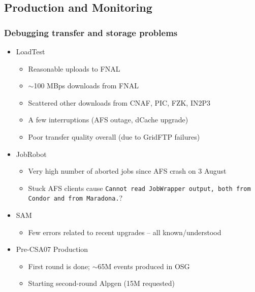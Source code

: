 \documentclass{beamer}
\newcommand{\ca}{\ensuremath{\sim}}
\begin{document}
\subsection{Production and Monitoring}
\begin{frame}
\frametitle{Debugging transfer and storage problems}
\begin{itemize}
    \item LoadTest
    \begin{itemize}
        \item Reasonable uploads to FNAL
        \item \ca{}100 MBps downloads from FNAL
        \item Scattered other downloads from CNAF, PIC, FZK, IN2P3
        \item A few interruptions (AFS outage, dCache upgrade)
        \item Poor transfer quality overall (due to GridFTP failures)
    \end{itemize}
    \item JobRobot
    \begin{itemize}
        \item Very high number of aborted jobs since AFS crash on 3 August
        \item Stuck AFS clients cause {\tt Cannot read JobWrapper output, both from Condor and from Maradona.}?
    \end{itemize}
    \item SAM
    \begin{itemize}
        \item Few errors related to recent upgrades -- all known/understood
    \end{itemize}
    \item Pre-CSA07 Production
    \begin{itemize}
        \item First round is done; \ca{}65M events produced in OSG
        \item Starting second-round Alpgen (15M requested)
    \end{itemize}
\end{itemize}
\end{frame}
\end{document}
